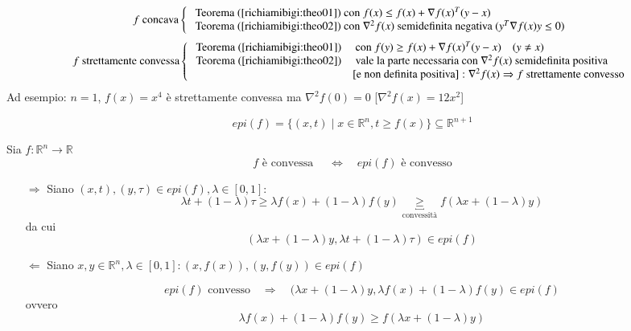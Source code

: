 \begin{observation}
$$f \text{ concava} 
\left\{
\begin{array}{l}
\text{ Teorema } (\ref{richiamibigi:theo01}) \text{ con }
  f(x) \leq f(x) + \nabla f(x)^{T}(y-x) \\
\text{ Teorema } (\ref{richiamibigi:theo02}) \text{ con }
  \nabla^{2}f(x) \text{ semidefinita negativa } (y^{T} \nabla f(x)y \leq 0)
\end{array}
\right.
$$
$$
f \text{ strettamente convessa} 
\left\{
\begin{array}{ll}
\text{ Teorema }   (\ref{richiamibigi:theo01}) & \text{ con }
  f(y) \geq f(x) + \nabla f(x)^{T}(y-x) \quad (y\neq x) \\
\text{ Teorema }   (\ref{richiamibigi:theo02}) & 
   \text{ vale la parte necessaria con }
  \nabla^{2}f(x) \text{ semidefinita positiva}  \\
 & [\text{e non definita positiva}]: \nabla^{2}f(x) \Rightarrow f \text{ strettamente convesso} 
\end{array}
\right.
$$
Ad esempio: $n=1$, $f(x)=x^{4}$ \`e strettamente convessa ma
$\nabla^{2}f(0) = 0$ [$\nabla^{2}f(x)=12x^2$]
\end{observation}

\begin{defn}[Epigrafico]
$$ epi(f) = \{ (x,t) \; | \; x \in \mathbb{R}^{n}, t \geq f(x) \}
\subseteq \mathbb{R}^{n+1}
$$
\end{defn}

\begin{property}
Sia $f: \mathbb{R}^{n} \rightarrow \mathbb{R}$ 
$$f  \text{ è convessa } \quad   \Longleftrightarrow  
 \quad epi(f)
 \text { è convesso}$$
\end{property}

\begin{thproof}
\begin{itemize}
\item[$\Longrightarrow$]
 Siano $(x,t), (y,\tau) \in epi(f), \lambda \in [0,1]$:
$$
\lambda t + (1-\lambda) \tau \geq \lambda f(x) + 
(1-\lambda) f(y) \underbracket{\geq}_{\text{convessit\`a}}
f(\lambda x + (1-\lambda)y)
$$
da cui
$$ (\lambda x + (1-\lambda) y, 
\lambda t + (1-\lambda) \tau) \in epi(f)
$$
\item[$\Longleftarrow$]
Siano $x,y \in \mathbb{R}^{n}, \lambda \in [0,1]:
 (x,f(x)) ,(y,f(y)) \in epi(f)$

$$ epi(f) \text{ convesso} \quad
\Longrightarrow \quad
(\lambda x + (1-\lambda) y, \lambda f(x) + (1-\lambda) f(y)
 \in epi(f) 
$$
ovvero
$$ \lambda f(x) + (1-\lambda)f(y) \geq f(\lambda x + (1-\lambda)y)$$
\end{itemize}

\end{thproof}




